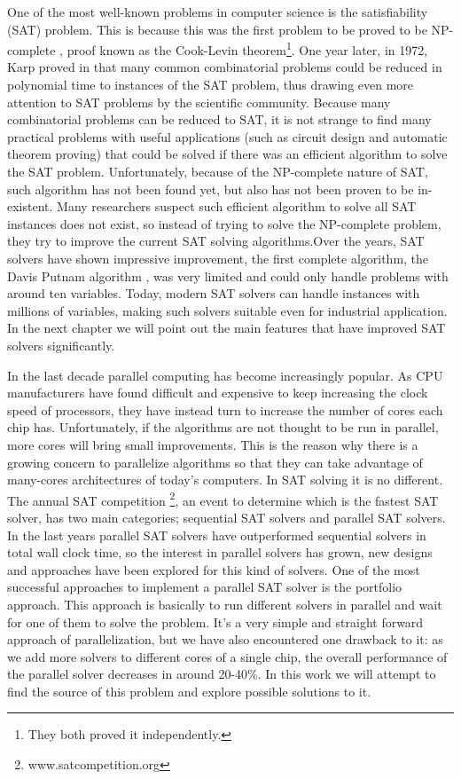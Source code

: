 \documentclass[12pt]{diicc}
\begin{document}
One of the most well-known problems in computer \cite{drepper2007} science is the satisfiability (SAT) problem. This is because this was the first problem to be proved to be NP-complete \cite{cook1971}, proof known as the Cook-Levin theorem\footnote[1]{They both proved it independently.}. One year later, in 1972, Karp proved in \cite{karp1972} that many common combinatorial problems could be reduced in polynomial time to instances of the SAT problem, thus drawing even more attention to SAT problems by the scientific community. Because many combinatorial problems can be reduced to SAT, it is not strange to find many practical problems with useful applications (such as circuit design and automatic theorem proving) that could be solved if there was an efficient algorithm to solve the SAT problem. Unfortunately, because of the NP-complete nature of SAT, such algorithm has not been found yet, but also has not been proven to be in-existent. Many researchers suspect such efficient algorithm to solve all SAT instances does not exist, so instead of trying to solve the NP-complete problem, they try to improve the current SAT solving algorithms.Over the years, SAT solvers have shown impressive improvement, the first complete algorithm, the Davis Putnam algorithm \cite{DP1960}, was very limited and could only handle problems with around ten variables. Today, modern SAT solvers can handle instances with millions of variables, making such solvers suitable even for industrial application. In the next chapter we will point out the main features that have improved SAT solvers significantly. 

In the last decade parallel computing has become increasingly popular. As CPU manufacturers have found difficult and expensive to keep increasing the clock speed of processors, they have instead turn to increase the number of cores each chip has. Unfortunately, if the algorithms are not thought to be run in parallel, more cores will bring small improvements. This is the reason why there is a growing concern to parallelize algorithms so that they can take advantage of many-cores architectures of today's computers. In SAT solving it is no different. The annual SAT competition \footnote[1]{www.satcompetition.org}, an event to determine which is the fastest SAT solver, has two main categories; sequential SAT solvers and parallel SAT solvers. In the last years parallel SAT solvers have outperformed sequential solvers in total wall clock time, so the interest in parallel solvers has grown, new designs and approaches have been explored for this kind of solvers. One of the most successful approaches to implement a parallel SAT solver is the portfolio approach. This approach is basically to run different solvers in parallel and wait for one of them to solve the problem. It's a very simple and straight forward approach of parallelization, but we have also encountered one drawback to it: as we add more solvers to different cores of a single chip, the overall performance of the parallel solver decreases in around 20-40\%. In this work we will attempt to find the source of this problem and explore possible solutions to it. 
\end{document}
